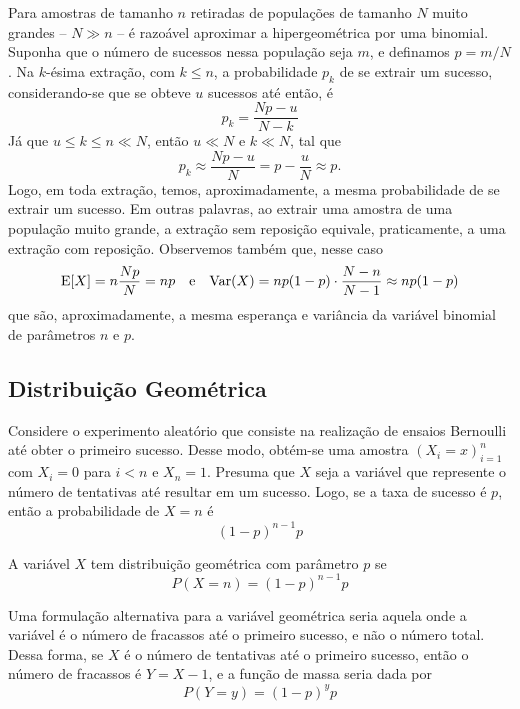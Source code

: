 \begin{obs:hipergeometrica 2}
Para amostras de tamanho $n$ retiradas de populações de tamanho $N$ muito grandes --
$N \gg n$ -- é razoável aproximar a hipergeométrica por uma binomial.
Suponha que o número de sucessos nessa população seja $m$, e definamos $p = m/N$.
Na $k$-ésima extração, com $k \le n$, a probabilidade $p_k$ de se extrair um sucesso,
considerando-se que se obteve $u$ sucessos até então, é
\[
    p_k = \frac{Np - u}{N - k}
\]
Já que $u \le k \le n \ll N$, então $u \ll N$ e $k \ll N$, tal que
\[
    p_k \approx \frac{Np - u}{N} = p - \frac{u}{N} \approx p.
\]
Logo, em toda extração, temos, aproximadamente, a mesma probabilidade de se extrair um sucesso.
Em outras palavras, ao extrair uma amostra de uma população muito grande, a extração sem
reposição equivale, praticamente, a uma extração com reposição.
Observemos também que, nesse caso
\[
    \mathrm{E}\!\left[X\right] = n \frac{Np}{N} = np \quad \text{e} \quad \mathrm{Var}\!\left(X\right) = np(1 - p) \cdot \frac{N-n}{N-1} \approx np(1 -p)
\]
que são, aproximadamente, a mesma esperança e variância da variável binomial de parâmetros
$n$ e $p$.
\end{obs:hipergeometrica 2}

\subsection{Distribuição Geométrica}

Considere o experimento aleatório que consiste na realização de ensaios Bernoulli até
obter o primeiro sucesso.
Desse modo, obtém-se uma amostra $(X_i = x)_{i=1}^n$ com $X_i = 0$ para $i < n$ e $X_n = 1$.
Presuma que $X$ seja a variável que represente o número de tentativas até resultar em um
sucesso.
Logo, se a taxa de sucesso é $p$, então a probabilidade de $X = n$ é
\[
    (1-p)^{n-1}p
\]

\begin{def:geometrica}
A variável $X$ tem distribuição geométrica com parâmetro $p$ se
\[
    P(X = n) = (1-p)^{n-1}p
\]
\end{def:geometrica}

\begin{obs:geometrica 2}
Uma formulação alternativa para a variável geométrica seria aquela onde a variável é
o número de fracassos até o primeiro sucesso, e não o número total.
Dessa forma, se $X$ é o número de tentativas até o primeiro sucesso, então o número de
fracassos é $Y = X - 1$, e a função de massa seria dada por
\[
    P(Y = y) = (1-p)^yp
\]
\end{obs:geometrica 2}

